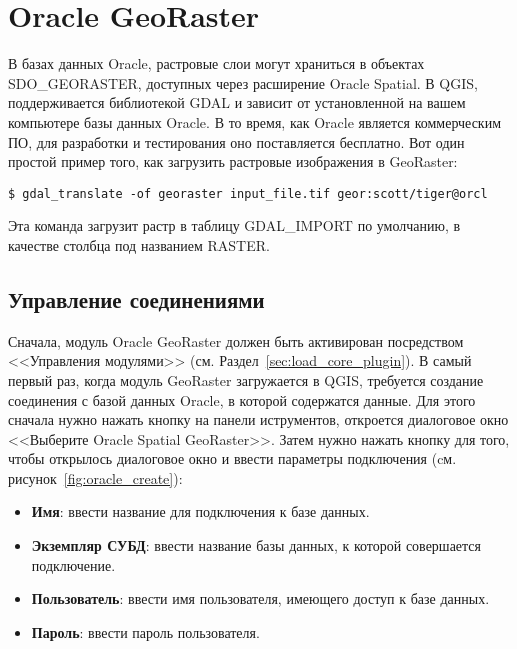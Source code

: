 
\section{Oracle GeoRaster}


В базах данных Oracle, растровые слои могут храниться в объектах
SDO\_GEORASTER, доступных через расширение Oracle Spatial. В QGIS,
 поддерживается
библиотекой GDAL и зависит от установленной на вашем компьютере базы
данных Oracle. В то время, как Oracle является коммерческим ПО, для
разработки и тестирования оно поставляется бесплатно. Вот один простой
пример того, как загрузить растровые изображения в GeoRaster:

\begin{verbatim}
$ gdal_translate -of georaster input_file.tif geor:scott/tiger@orcl
\end{verbatim}

Эта команда загрузит растр в таблицу GDAL\_IMPORT по умолчанию, в
качестве столбца под названием RASTER.

\subsection{Управление соединениями}

Сначала, модуль Oracle GeoRaster должен быть активирован посредством
<<Управления модулями>> (см. Раздел~\ref{sec:load_core_plugin}). В самый
первый раз, когда модуль GeoRaster загружается в QGIS, требуется
создание соединения с базой данных Oracle, в которой содержатся данные.
Для этого сначала нужно нажать кнопку
 на панели
иструментов, откроется диалоговое окно <<Выберите Oracle Spatial GeoRaster>>.
Затем нужно нажать кнопку  для того, чтобы открылось
диалоговое окно и ввести параметры подключения (cм. рисунок~\ref{fig:oracle_create}):

\begin{itemize}[label=--]
\item \textbf{Имя}: ввести название для подключения к базе данных.
\item \textbf{Экземпляр СУБД}: ввести название базы данных, к которой
совершается подключение.
\item \textbf{Пользователь}: ввести имя пользователя, имеющего доступ
к базе данных.
\item \textbf{Пароль}: ввести пароль пользователя.
\end{itemize}


